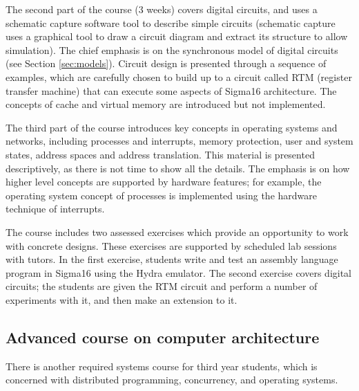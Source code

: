 \documentclass[submission,copyright,creativecommons]{eptcs}
\begin{document}
The second part of the course (3 weeks) covers digital circuits, and
uses a schematic capture software tool to describe simple circuits
(schematic capture uses a graphical tool to draw a circuit diagram and
extract its structure to allow simulation).  The chief emphasis is on
the synchronous model of digital circuits (see Section
\ref{sec:models}).  Circuit design is presented through a sequence of
examples, which are carefully chosen to build up to a circuit called
RTM (register transfer machine) that can execute some aspects of
Sigma16 architecture.  The concepts of cache and virtual memory are
introduced but not implemented.

The third part of the course introduces key concepts in operating
systems and networks, including processes and interrupts, memory
protection, user and system states, address spaces and address
translation.  This material is presented descriptively, as there is
not time to show all the details.  The emphasis is on how higher level
concepts are supported by hardware features; for example, the
operating system concept of processes is implemented using the
hardware technique of interrupts.

The course includes two assessed exercises which provide an
opportunity to work with concrete designs.  These exercises are
supported by scheduled lab sessions with tutors.  In the first
exercise, students write and test an assembly language program in
Sigma16 using the Hydra emulator.  The second exercise covers digital
circuits; the students are given the RTM circuit and perform a number
of experiments with it, and then make an extension to it.

\subsection{Advanced course on computer architecture}
\label{sec:CA4-course-topics}

There is another required systems course for third year students,
which is concerned with distributed programming, concurrency, and
operating systems.
\end{document}
